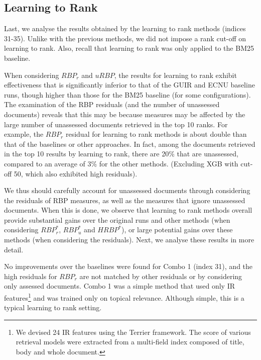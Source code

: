 \subsection{Learning to Rank}
\label{results:ltr}

Last, we analyse the results obtained by the learning to rank methods (indices 31-35). Unlike with the previous methods, we did not impose a rank cut-off on learning to rank. Also, recall that learning to rank was only applied to the BM25 baseline. 

When considering $RBP_r$ and $uRBP$, the results for learning to rank exhibit effectiveness that is significantly inferior to that of the GUIR and ECNU baseline runs, though higher than those for the BM25 baseline (for some configurations). The examination of the RBP residuals (and the number of unassessed documents) reveals that this may be because measures may be affected by the large number of unassessed documents retrieved in the top 10 ranks. For example, the $RBP_r$ residual for learning to rank methods is about double than that of the baselines or other approaches. In fact, among the documents retrieved in the top 10 results by learning to rank, there are 20\% that are unassessed, compared to an average of 3\% for the other methods. (Excluding XGB with cut-off 50, which also exhibited high residuals). 


We thus should carefully account for unassessed documents through considering the residuals of RBP measures, as well as the measures that ignore unassessed documents. When this is done, we observe that learning to rank methods overall provide substantial gains over the original runs and other methods (when considering $RBP^*_r$, $RBP^*_u$ and $HRBP^*$), or large potential gains over these methods (when considering the residuals). Next, we analyse these results in more detail. 

No improvements over the baselines were found for Combo 1 (index 31), and the high residuals for $RBP_r$ are not matched by other residuals or by considering only assessed documents. Combo 1 was a simple method that used only IR features\footnote{We devised 24 IR features using the Terrier framework. The score of various retrieval models were extracted from a multi-field index composed of title, body and whole document.} and was trained only on topical relevance. Although simple, this is a typical learning to rank setting.

